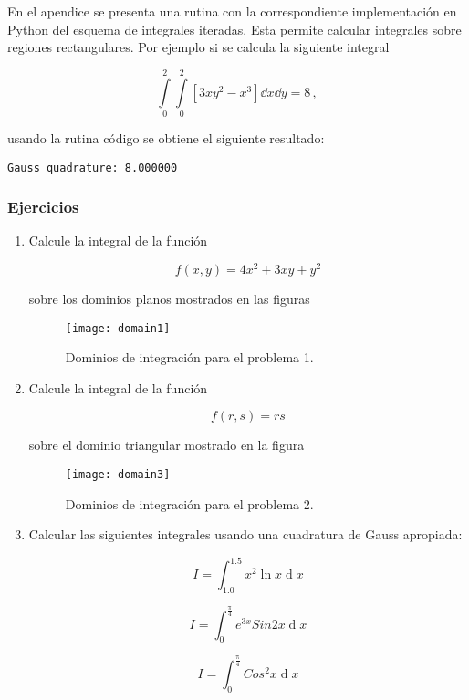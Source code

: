 En el apendice se presenta una rutina con la correspondiente implementación en Python del esquema de integrales iteradas. Esta permite calcular integrales sobre regiones rectangulares. Por ejemplo si se calcula la siguiente integral

\[\int\limits_0^2\int\limits_0^2 [3xy^2 - x^3] \dd{x}\dd{y} = 8\, , \]

usando la rutina código se obtiene el siguiente resultado:

\begin{verbatim}
Gauss quadrature: 8.000000
\end{verbatim}

\newpage
\subsubsection{Ejercicios}
\begin{enumerate}
%	
	\item \label{punto01} Calcule la integral de la función
	
	\[f(x,y)=4x^2+3xy+y^2\]
	
	sobre los dominios planos mostrados en las figuras
	
	
	\begin{figure}[H]
		\centering
		\texttt{[image: domain1]}
		\caption{Dominios de integración para el problema 1.}
		\label{fig:tan1}
	\end{figure}
	
	

	
	
	\item \label{punto02} Calcule la integral de la función
	
	\[f(r,s)=rs\]
	
	sobre el dominio triangular mostrado en la figura
	
	\begin{figure}[H]
		\centering
		\texttt{[image: domain3]}
		\caption{Dominios de integración para el problema 2.}
		\label{fig:tan2}
	\end{figure}
	
	\item \label{punto03} Calcular las siguientes integrales usando una cuadratura de Gauss apropiada:
	
	\[I=\int_{1.0}^{1.5}x^2\ln x\operatorname dx\]
	
	\[I=\int_0^\frac{\mathrm\pi}4e^{3x}Sin2x\operatorname dx\]
	
	\[I=\int_0^\frac{\mathrm\pi}4Cos^2x\operatorname dx\]

	
	
\end{enumerate}

